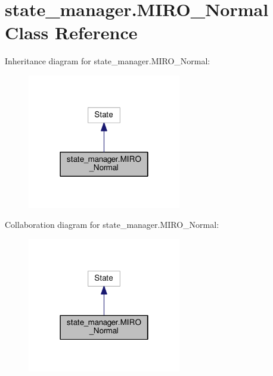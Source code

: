 \hypertarget{classstate__manager_1_1MIRO__Normal}{}\section{state\+\_\+manager.\+M\+I\+R\+O\+\_\+\+Normal Class Reference}
\label{classstate__manager_1_1MIRO__Normal}


Inheritance diagram for state\+\_\+manager.\+M\+I\+R\+O\+\_\+\+Normal\+:\nopagebreak
\begin{figure}[H]
\begin{center}
\leavevmode
\includegraphics[width=190pt]{classstate__manager_1_1MIRO__Normal__inherit__graph}
\end{center}
\end{figure}


Collaboration diagram for state\+\_\+manager.\+M\+I\+R\+O\+\_\+\+Normal\+:\nopagebreak
\begin{figure}[H]
\begin{center}
\leavevmode
\includegraphics[width=190pt]{classstate__manager_1_1MIRO__Normal__coll__graph}
\end{center}
\end{figure}
